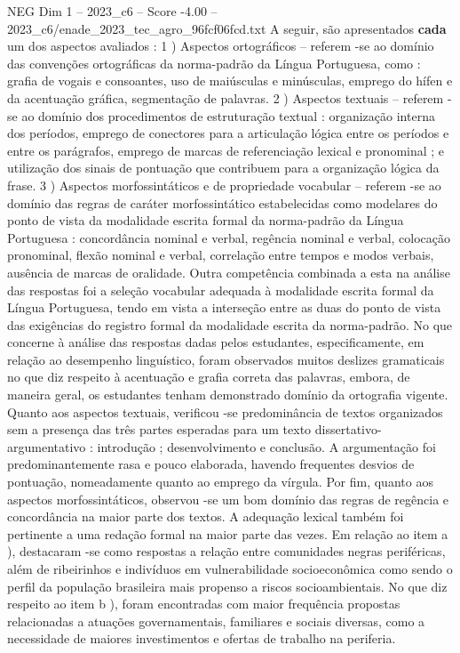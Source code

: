 \begin{textsample}{NEG Dim 1 – 2023\_c6 – Score -4.00 – 2023\_c6/enade\_2023\_tec\_agro\_96fcf06fcd.txt}
A seguir, são apresentados \textbf{cada} um dos aspectos avaliados : 1 ) Aspectos ortográficos – referem -se ao domínio das convenções ortográficas da norma-padrão da Língua Portuguesa, como : grafia de vogais e consoantes, uso de maiúsculas e minúsculas, emprego do hífen e da acentuação gráfica, segmentação de palavras. 2 ) Aspectos textuais – referem -se ao domínio dos procedimentos de estruturação textual : organização interna dos períodos, emprego de conectores para a articulação lógica entre os períodos e entre os parágrafos, emprego de marcas de referenciação lexical e pronominal ; e utilização dos sinais de pontuação que contribuem para a organização lógica da frase. 3 ) Aspectos morfossintáticos e de propriedade vocabular – referem -se ao domínio das regras de caráter morfossintático estabelecidas como modelares do ponto de vista da modalidade escrita formal da norma-padrão da Língua Portuguesa : concordância nominal e verbal, regência nominal e verbal, colocação pronominal, flexão nominal e verbal, correlação entre tempos e modos verbais, ausência de marcas de oralidade.
Outra competência combinada a esta na análise das respostas foi a seleção vocabular adequada à modalidade escrita formal da Língua Portuguesa, tendo em vista a interseção entre as duas do ponto de vista das exigências do registro formal da modalidade escrita da norma-padrão.
No que concerne à análise das respostas dadas pelos estudantes, especificamente, em relação ao desempenho linguístico, foram observados muitos deslizes gramaticais no que diz respeito à acentuação e grafia correta das palavras, embora, de maneira geral, os estudantes tenham demonstrado domínio da ortografia vigente.
Quanto aos aspectos textuais, verificou -se predominância de textos organizados sem a presença das três partes esperadas para um texto dissertativo-argumentativo : introdução ; desenvolvimento e conclusão.
A argumentação foi predominantemente rasa e pouco elaborada, havendo frequentes desvios de pontuação, nomeadamente quanto ao emprego da vírgula.
Por fim, quanto aos aspectos morfossintáticos, observou -se um bom domínio das regras de regência e concordância na maior parte dos textos.
A adequação lexical também foi pertinente a uma redação formal na maior parte das vezes.
Em relação ao item a ), destacaram -se como respostas a relação entre comunidades negras periféricas, além de ribeirinhos e indivíduos em vulnerabilidade socioeconômica como sendo o perfil da população brasileira mais propenso a riscos socioambientais.
No que diz respeito ao item b ), foram encontradas com maior frequência propostas relacionadas a atuações governamentais, familiares e sociais diversas, como a necessidade de maiores investimentos e ofertas de trabalho na periferia.

\end{textsample}
